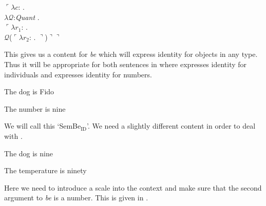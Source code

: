\begin{ex} 
  $\ulcorner\lambda c$: . \\
        \hspace*{1em}$\lambda\mathcal{Q}$:\textit{Quant} . \\
        \hspace*{2em} $\ulcorner\lambda r_1$:
. \\
\hspace*{3em} $\mathcal{Q}$($\ulcorner\lambda
r_2$:
. $\urcorner$)$\urcorner\urcorner$ 
\end{ex}
This gives us a content for \textit{be} which will express identity
for objects in any type.  Thus it will be appropriate for both
sentences in \nexteg{} where  expresses identity for
individuals and  expresses identity for numbers.
\begin{ex} 
\begin{subex} 
 
\item The dog is Fido 
 
\item The number is nine 
 
\end{subex} 
   
\end{ex} 
We will call this `SemBe$_{\text{ID}}$'.  We need a slightly different
content in order to deal with \nexteg{}.
\begin{ex}
  \begin{subex} 
 
\item The dog is nine 
 
\item The temperature is ninety 
 
\end{subex} 
  
 
\end{ex} 
Here we need to introduce a scale into the context and make sure that
the second argument to \textit{be} is a number.  This is given in
\nexteg{}.
